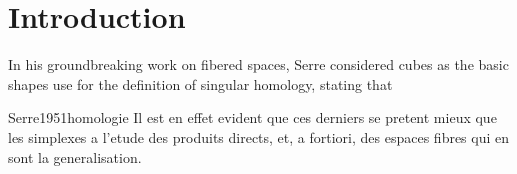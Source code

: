 
\section{Introduction} \label{s:introduction}

In his groundbreaking work on fibered spaces, Serre considered cubes as the basic shapes use for the definition of singular homology, stating that

\begin{displaycquote}[p.431]{Serre1951homologie}
	Il est en effet evident que ces derniers se pretent mieux que les simplexes a l'etude des produits directs, et, a fortiori, des espaces fibres qui en sont la generalisation.
\end{displaycquote}